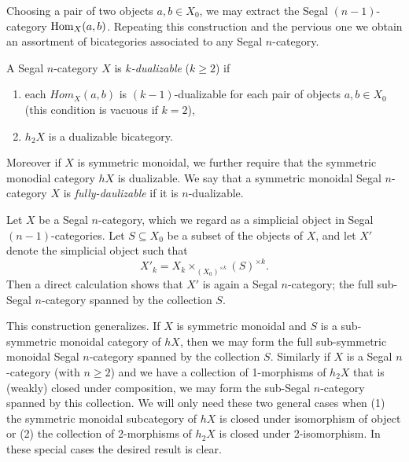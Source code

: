\documentclass{amsart}
\begin{document}
Choosing a pair of two objects $a,b \in X_0$, we may extract the Segal $(n-1)$-category $\operatorname{Hom}_X(a,b)$. Repeating this construction and the pervious one we obtain an assortment of bicategories associated to any Segal $n$-category. 

\begin{definition}
	A Segal $n$-category $X$ is {\em $k$-dualizable} ($k\geq 2$) if 
	\begin{enumerate}
		\item each $Hom_X(a,b)$ is $(k-1)$-dualizable for each pair of objects $a,b \in X_0$ (this condition is vacuous if $k=2$), 
		\item $\mathit{h}_2 X$ is a dualizable bicategory. 
	\end{enumerate}
Moreover if $X$ is symmetric monoidal, we further require that the symmetric monodial category $\mathit{h} X$ is dualizable. We say that a symmetric monoidal Segal $n$-category $X$ is {\em fully-daulizable} if it is $n$-dualizable.
\end{definition}

Let $X$ be a Segal $n$-category, which we regard as a simplicial object in Segal $(n-1)$-categories. Let $S \subseteq X_0$ be a subset of the objects of $X$, and let $X'$ denote the simplicial object such that
	\begin{equation*}
		X'_k =  X_k \times_{(X_0)^{\times k}} (S)^{\times k}.
	\end{equation*}
Then a direct calculation shows that $X'$ is again a Segal $n$-category; the full sub-Segal $n$-category spanned by the collection $S$. 

This construction generalizes. If $X$ is symmetric monoidal and $S$ is a sub-symmetric monoidal category of $\mathit{h}X$, then we may form the full sub-symmetric monoidal Segal $n$-category spanned by the collection $S$. Similarly if $X$ is a Segal $n$-category (with $n\geq 2$) and we have a collection of 1-morphisms of $\mathit{h}_2 X$ that is (weakly) closed under composition,  we may form the sub-Segal $n$-category spanned by this collection.  We will only need these two general cases when (1) the symmetric monoidal subcategory of $\mathit{h}X$ is closed under isomorphism of object or (2) the collection of 2-morphisms of $\mathit{h}_2 X$ is closed under 2-isomorphism. In these special cases the desired result is clear. 
\end{document}
